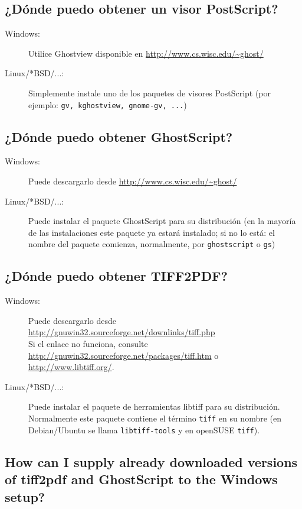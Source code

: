 \documentclass[a4paper,10pt]{scrartcl}
\begin{document}
\subsection{¿Dónde puedo obtener un visor PostScript?}
\begin{description}
\item[Windows:] Utilice Ghostview disponible en
\url{http://www.cs.wisc.edu/~ghost/}\\
\item[Linux/*BSD/...:] Simplemente instale uno de los paquetes de visores PostScript
		(por ejemplo: \texttt{gv, kghostview, gnome-gv, ...})
\end{description}


\subsection{¿Dónde puedo obtener GhostScript?}
\begin{description}
\item[Windows:] Puede descargarlo desde \url{http://www.cs.wisc.edu/~ghost/}
\item[Linux/*BSD/...:] Puede instalar el paquete GhostScript para su distribución (en la mayoría de las instalaciones este paquete ya estará instalado; si no lo está: el nombre del paquete comienza, normalmente, por \texttt{ghostscript} o \texttt{gs})
\end{description}

\subsection{¿Dónde puedo obtener TIFF2PDF?}
\begin{description}
\item[Windows:] Puede descargarlo desde \url{http://gnuwin32.sourceforge.net/downlinks/tiff.php}\\ Si el enlace no funciona, consulte \url{http://gnuwin32.sourceforge.net/packages/tiff.htm} o \url{http://www.libtiff.org/}.
\item[Linux/*BSD/...:] Puede instalar el paquete de herramientas libtiff para su distribución. Normalmente este paquete contiene el término \texttt{tiff} en su nombre (en Debian/Ubuntu se llama \texttt{libtiff-tools} y en openSUSE \texttt{tiff}).
\end{description}

\subsection{How can I supply already downloaded versions of tiff2pdf and GhostScript to the Windows setup?}
\end{document}
